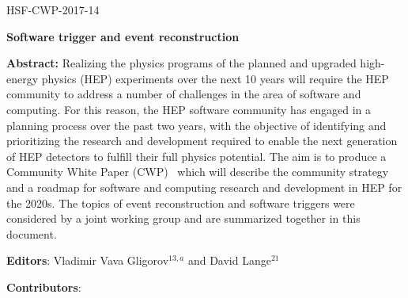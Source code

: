 \begin{flushright}
HSF-CWP-2017-14
\end{flushright}

\Large
\begin{center}
{\bf Software trigger and event reconstruction}
\end{center}
\vskip 1cm

\normalsize


\hangindent=1cm
{\bf Abstract:} Realizing the physics programs of the planned and upgraded high-energy physics (HEP) experiments over the next 10 years will require the HEP community to address a number of challenges in the area of software and computing. For this reason, the HEP software community has engaged in a planning process over the past two years, with the objective of identifying and prioritizing the research and development required to enable the next generation of HEP detectors to fulfill their full physics potential. The aim is to produce a Community White Paper (CWP)~\cite{HSF2017} which will describe the community strategy and a roadmap for software and computing research and development in HEP for the 2020s. The topics of event reconstruction and software triggers were considered by a joint working group and are summarized together in this document.

\vskip 1cm


\hangindent=1cm
{\bf Editors}: Vladimir Vava Gligorov$^{13,a}$ and David Lange$^{21}$

\vskip 0.2cm
\hangindent=1cm
{\bf Contributors}:

